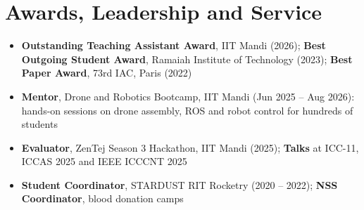 \documentclass[letterpaper,10pt]{article}
\newenvironment{bullets}{\begin{itemize}[label=\textbullet]\small}{\end{itemize}\vspace{-2pt}}
\begin{document}
\section{Awards, Leadership and Service}
\begin{bullets}
  \item \textbf{Outstanding Teaching Assistant Award}, IIT Mandi (2026); \textbf{Best Outgoing Student Award}, Ramaiah Institute of Technology (2023); \textbf{Best Paper Award}, 73rd IAC, Paris (2022)
  \item \textbf{Mentor}, Drone and Robotics Bootcamp, IIT Mandi (Jun 2025 -- Aug 2026): hands-on sessions on drone assembly, ROS and robot control for hundreds of students
  \item \textbf{Evaluator}, ZenTej Season 3 Hackathon, IIT Mandi (2025); \textbf{Talks} at ICC-11, ICCAS 2025 and IEEE ICCCNT 2025
  \item \textbf{Student Coordinator}, STARDUST RIT Rocketry (2020 -- 2022); \textbf{NSS Coordinator}, blood donation camps
\end{bullets}
\end{document}
